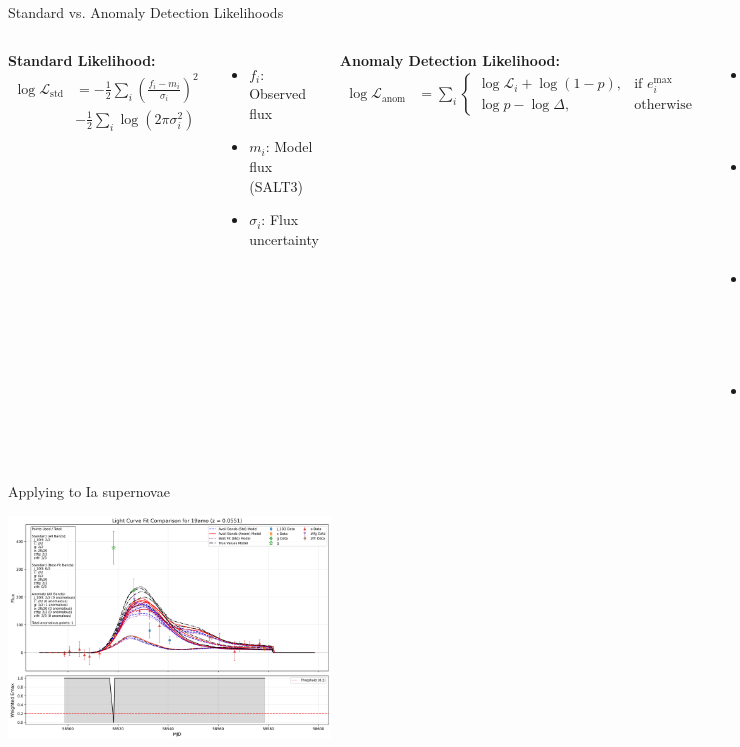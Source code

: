 \documentclass[aspectratio=169]{beamer}
\begin{document}
\begin{frame}{Standard vs. Anomaly Detection Likelihoods}
  \begin{columns}
    \textbf{Standard Likelihood:}
    \begin{align}
      \log \mathcal{L}_{\text{std}} &= -\frac{1}{2}\sum_i \left(\frac{f_i - m_i}{\sigma_i}\right)^2 \nonumber \\
      &- \frac{1}{2}\sum_i \log(2\pi\sigma_i^2)
    \end{align}
    \begin{itemize}
      \item $f_i$: Observed flux
      \item $m_i$: Model flux (SALT3)
      \item $\sigma_i$: Flux uncertainty
    \end{itemize}
    
    \textbf{Anomaly Detection Likelihood:}
    \begin{align}
      \log \mathcal{L}_{\text{anom}} &= \sum_i \begin{cases}
        \log \mathcal{L}_i + \log(1-p), & \text{if } e_i^{\max} \\
        \log p - \log \Delta, & \text{otherwise}
      \end{cases}
    \end{align}
    \begin{itemize}
      \item $\log \mathcal{L}_i$: Point-wise standard likelihood
      \item $p$: Anomaly probability (fitted parameter)
      \item $e_i^{\max}$: Boolean indicating normal data
      \item $\Delta$: Maximum flux range
    \end{itemize}
  \end{columns}
  
\end{frame}
\begin{frame}{Applying to Ia supernovae}
\begin{center}
  \includegraphics[width=0.64\textwidth]{images/light_curve_comparison_19amo.png}
\end{center}
\end{frame}
\end{document}
